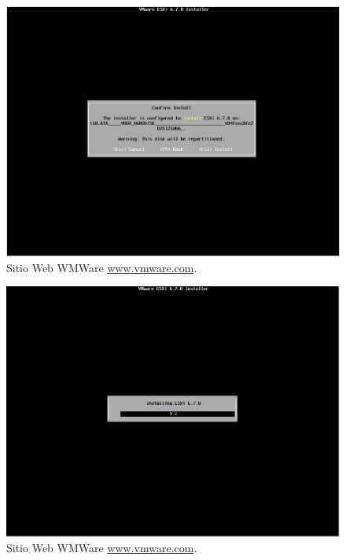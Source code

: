 \begin{figure}[!hbtp]
	\centering
	\includegraphics[width=\linewidth]{RE01_VMwareESXi/RE_VMwareInstalacion11.png}
	\vspace{-0.2cm}
	\caption{Sitio Web WMWare \url{www.vmware.com}.\footnotemark[2]{} }
	\label{fig:VMwareInstalacion11}
\end{figure}


\begin{figure}[!hbtp]
	\centering
	\includegraphics[width=\linewidth]{RE01_VMwareESXi/RE_VMwareInstalacion12.png}
	\vspace{-0.2cm}
	\caption{Sitio Web WMWare \url{www.vmware.com}.\footnotemark[2]{} }
	\label{fig:VMwareInstalacion12}
\end{figure}


